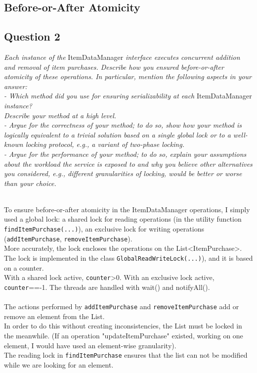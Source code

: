 \documentclass[paper=a4, fontsize=11pt]{scrartcl} %
\numberwithin{equation}{section} %
\numberwithin{figure}{section} %
\numberwithin{table}{section} %
\begin{document}
 \clearpage
 
\subsection{Before-or-After Atomicity}

\subsection{Question 2}

\textit{Each instance of the }ItemDataManager\textit{ interface executes
concurrent addition and removal of item purchases. Describe how you ensured before-or-after atomicity
of these operations. In particular, mention the following aspects in your answer:}\\
\textit{- Which method did you use for ensuring serializability at each }ItemDataManager\textit{ instance?}\\
\textit{Describe your method at a high level.}\\
\textit{- Argue for the correctness of your method; to do so, show how your method is logically equivalent
to a trivial solution based on a single global lock or to a well-known locking protocol, e.g., a
variant of two-phase locking.\\
- Argue for the performance of your method; to do so, explain your assumptions about the
workload the service is exposed to and why you believe other alternatives you considered, e.g.,
different granularities of locking, would be better or worse than your choice.\\}

~\\
To ensure before-or-after atomicity in the ItemDataManager operations, I simply used a global lock: a shared lock for reading operations (in the utility function \verb|findItemPurchase(...)|), an exclusive lock for writing operations (\verb|addItemPurchase|, \verb!removeItemPurchase!).\\ More accurately, the lock encloses the operations on the List<ItemPurchase>.\\
The lock is implemented in the class \verb|GlobalReadWriteLock(...)|), and it is based on a counter.\\
With a shared lock active, \verb!counter!>0. With an exclusive lock active, \verb!counter!==-1. The threads are handled with wait() and notifyAll().\\
~\\
The actions performed by \verb|addItemPurchase| and \verb|removeItemPurchase| add or remove an element from the List. \\
In order to do this without creating inconsistencies, the List must be locked in the meanwhile. (If an operation "updateItemPurchase" existed, working on one element, I would have used an element-wise granularity).\\
The reading lock in \verb|findItemPurchase| ensures that the list can not be modified while we are looking for an element.\\
~\\
\clearpage
\end{document}
